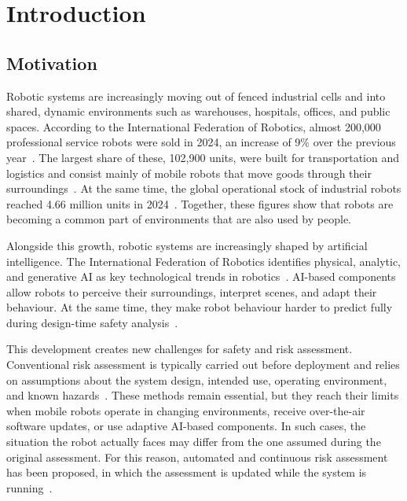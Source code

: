 \chapter{Introduction}

\section{Motivation}

{\small Robotic systems are increasingly moving out of fenced industrial cells and into shared, dynamic environments such as warehouses, hospitals, offices, and public spaces. According to the International Federation of Robotics, almost 200,000 professional service robots were sold in 2024, an increase of 9\% over the previous year~\cite{ifr2025servicerobots}. The largest share of these, 102,900 units, were built for transportation and logistics and consist mainly of mobile robots that move goods through their surroundings~\cite{ifr2025servicerobots}. At the same time, the global operational stock of industrial robots reached 4.66 million units in 2024~\cite{ifr2025robots}. Together, these figures show that robots are becoming a common part of environments that are also used by people.\par}

{\small Alongside this growth, robotic systems are increasingly shaped by artificial intelligence. The International Federation of Robotics identifies physical, analytic, and generative AI as key technological trends in robotics~\cite{ifr2025robots}. AI-based components allow robots to perceive their surroundings, interpret scenes, and adapt their behaviour. At the same time, they make robot behaviour harder to predict fully during design-time safety analysis~\cite{silvaneto2022aisafetyassurance}.\par}

{\small This development creates new challenges for safety and risk assessment. Conventional risk assessment is typically carried out before deployment and relies on assumptions about the system design, intended use, operating environment, and known hazards~\cite{iso12100}. These methods remain essential, but they reach their limits when mobile robots operate in changing environments, receive over-the-air software updates, or use adaptive AI-based components. In such cases, the situation the robot actually faces may differ from the one assumed during the original assessment. For this reason, automated and continuous risk assessment has been proposed, in which the assessment is updated while the system is running~\cite{grimmeisen2023continuousrisk}.\par}

